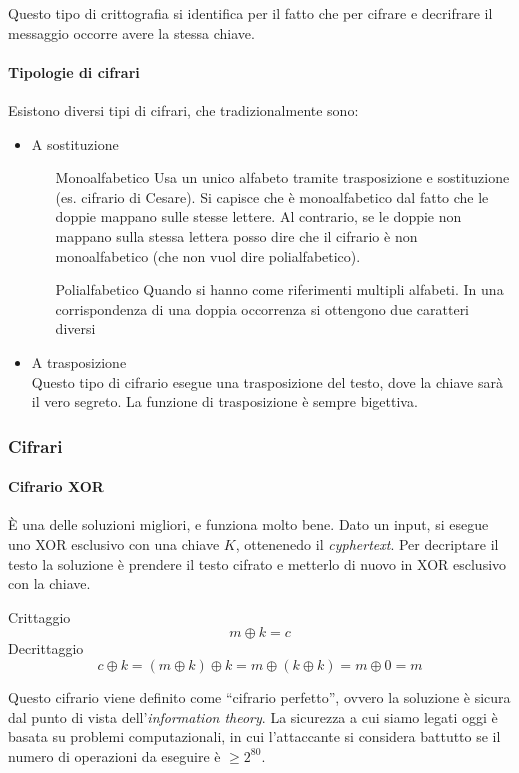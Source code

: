 Questo tipo di crittografia si identifica per il fatto che per cifrare e 
decrifrare il messaggio occorre avere la stessa chiave.

\paragraph*{Tipologie di cifrari} Esistono diversi tipi di cifrari, che 
tradizionalmente sono:
\begin{itemize}
 \item A sostituzione
 \begin{itemize}
  \item[Monoalfabetico] Usa un unico alfabeto tramite trasposizione e 
sostituzione (es. cifrario di 
Cesare). Si capisce che è monoalfabetico dal fatto che le doppie mappano sulle 
stesse lettere.
Al contrario, se le doppie non mappano sulla stessa lettera posso dire che il 
cifrario è non monoalfabetico (che non vuol dire polialfabetico).

  \item[Polialfabetico] Quando si hanno come riferimenti multipli alfabeti.
 In una corrispondenza di una doppia occorrenza si ottengono due caratteri 
diversi
 \end{itemize}
 \item A trasposizione \\
 Questo tipo di cifrario esegue una trasposizione del testo, dove la chiave sarà 
il vero segreto. La funzione di trasposizione è sempre bigettiva. 
\end{itemize}

\subsubsection{Cifrari}

\paragraph{Cifrario XOR}

È una delle soluzioni migliori, e funziona molto bene. Dato un input, si esegue 
uno XOR esclusivo con una chiave $K$, ottenenedo il \textit{cyphertext}. Per 
decriptare il testo la soluzione è prendere il testo cifrato e metterlo di nuovo 
in XOR esclusivo con la chiave.

Crittaggio
$$
m \oplus k = c
$$
\indent Decrittaggio
$$
c \oplus k = (m \oplus k) \oplus k = m \oplus (k \oplus k) = m \oplus 0 = m
$$

Questo cifrario viene definito come ``cifrario perfetto'', ovvero la soluzione è 
sicura dal punto di vista dell'\textit{information theory}. La sicurezza a cui 
siamo legati oggi è basata su problemi computazionali, in cui l'attaccante si 
considera battutto se il numero di operazioni da eseguire è $\ge 2^{80}$.

